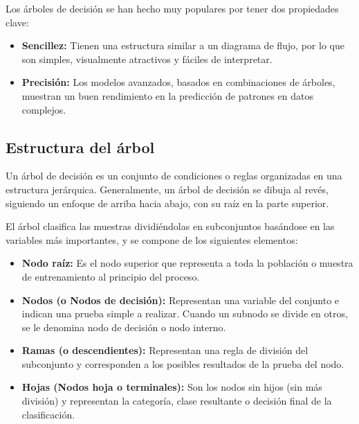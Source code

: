 \documentclass[twoside,a4paper,12pt,onecolumn,openany]{book}
\begin{document}
\vspace{0.5cm}

Los árboles de decisión se han hecho muy populares por tener dos propiedades clave:

\begin{itemize}
    \item \textbf{Sencillez:} Tienen una estructura similar a un diagrama de flujo, por lo que son simples, visualmente atractivos y fáciles de interpretar.
    \item \textbf{Precisión:} Los modelos avanzados, basados en combinaciones de árboles, muestran un buen rendimiento en la predicción de patrones en datos complejos.
\end{itemize}

 \subsection{Estructura del árbol}
 Un árbol de decisión es un conjunto de condiciones o reglas organizadas en una estructura jerárquica. Generalmente, un árbol de decisión se dibuja al revés, siguiendo un enfoque de arriba hacia abajo, con su raíz en la parte superior. 

 \vspace{0.5cm}

El árbol clasifica las muestras dividiéndolas en subconjuntos basándose en las variables más importantes, y se compone de los siguientes elementos:

\begin{itemize}
    \item \textbf{Nodo raíz:}  Es el nodo superior que representa a toda la población o muestra de entrenamiento al principio del proceso.
    
    \item \textbf{Nodos (o Nodos de decisión):} Representan una variable del conjunto e indican una prueba simple a realizar. Cuando un subnodo se divide en otros, se le denomina nodo de decisión o nodo interno. 

    \item \textbf{Ramas (o descendientes):}  Representan una regla de división del subconjunto y corresponden a los posibles resultados de la prueba del nodo.
    
    \item \textbf{Hojas (Nodos hoja o terminales):}  Son los nodos sin hijos (sin más división) y representan la categoría, clase resultante o decisión final de la clasificación.  
\end{itemize}
\end{document}
